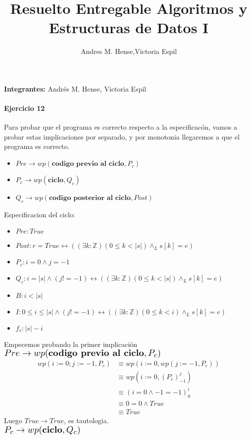 \documentclass[a4paper]{article}
\title{Resuelto Entregable Algoritmos y Estructuras de Datos I}
\author{Andres M. Hense,Victoria Espil}
\date{}
\begin{document}




\begin{center}
\textbf{Integrantes:} Andrés M. Hense, Victoria Espil
\end{center}

\paragraph{Ejercicio 12}
Para probar que el programa es correcto respecto a la especificacón, vamos a probar estas implicaciones
 por separado, y por monotonia llegaremos a que el programa es correcto.\\
\begin{itemize}
\item $Pre \rightarrow wp(\textbf{codigo previo al ciclo},P_c)$
\item $P_c \rightarrow wp(\textbf{ciclo},Q_c)$
\item $Q_c \rightarrow wp(\textbf{codigo posterior al ciclo},Post)$
\end{itemize}
 Especificacion del ciclo:
	\begin{itemize}
		\item $Pre: True$
		\item $Post: r=True \leftrightarrow ((\exists k:\mathbb{Z})(0\leq k<|s|)\wedge_L s[k]=e) $
		\item $P_c: i=0\wedge j=-1$
		\item $Q_c: i=|s|\wedge (j!=-1)\leftrightarrow ((\exists k:\mathbb{Z})(0\leq k<|s|)\wedge_L s[k]=e)$
		\item $B: i<|s|$
		\item $I: 0\leq i\leq|s|\wedge (j!=-1)\leftrightarrow ((\exists k:\mathbb{Z})(0\leq k<i)\wedge_L s[k]=e) $
		\item $f_v:|s|-i$
	\end{itemize}
Empecemos probando la primer implicación\medskip \\
$\scalebox{1.3}{$Pre\rightarrow wp(\textbf{codigo previo al ciclo},P_c)$}$\medskip \\
\begin{align*}
wp(i:=0; j:=-1,P_c)&\equiv wp(i:=0,wp(j:=-1,P_c))\\
&\equiv wp(i:=0,(P_c)_{-1}^{j})\\
&\equiv (i=0\wedge -1=-1)_{0}^{i}\\
&\equiv 0=0\wedge True\\
&\equiv True
\end{align*}
Luego $True\rightarrow True$, es tautologia.\medskip\\
$\scalebox{1.3}{$P_c \rightarrow wp(\textbf{ciclo},Q_c)$}$\medskip \\
\end{document}
